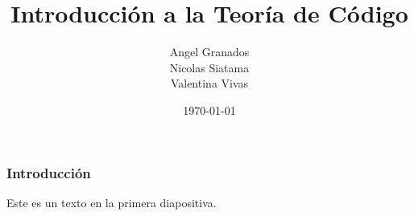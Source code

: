 \documentclass[spanish]{beamer}
\title{Introducción a la Teoría de Código}
\author{Angel Granados \\ Nicolas Siatama \\ Valentina Vivas}
\institute{Universidad Distrital Francisco José de Caldas \\ Gabriel Bravo Ríos}
\date{\today}
\begin{document}
	
	\frame{\titlepage}
	
	
	
	
	 
	
	\begin{frame}
		\frametitle{Introducción}
		Este es un texto en la primera diapositiva.
	\end{frame}
	
\end{document}
